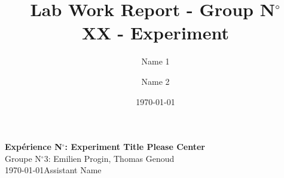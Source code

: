 \documentclass[a4paper, 12pt,oneside]{article}
\begin{document}
\title{\normalsize{Lab Work Report - Group N$^\circ$\\ XX - Experiment}}
\date{\normalsize{\today}}
\author{\normalsize{Name} 1\and \normalsize{Name 2}}
\newpage


\begin{center}
\large\textbf{\sffamily Expérience N$^\circ$: Experiment Title Please Center}\\%
\large\sffamily Groupe N$^\circ 3$: Emilien Progin, Thomas Genoud\\%
\large\sffamily \today\qquad Assistant Name\\%
\end{center}







\newpage



\end{document}
